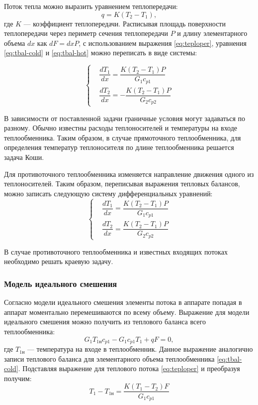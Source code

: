 Поток тепла можно выразить уравнением теплопередачи:
\begin{equation}\label{eq:teploper}
	q=K(T_2-T_1),
\end{equation}
где $K$ --- коэффициент теплопередачи. Расписывая площадь поверхности теплопередачи через периметр сечения теплопередачи $P$ и длину элементарного объема $d x$ как $d F = d x P$, с использованием выражения \eqref{eq:teploper}, уравнения \eqref{eq:tbal-cold} и \eqref{eq:tbal-hot} можно переписать в виде системы:

 \begin{equation} \label{eq:tep.pryamo}
 \left\{
 \begin{aligned}
 &\dfrac{dT_1}{dx}=\dfrac{K(T_2-T_1)P}{G_1 c_{p1}}        \\
 &\dfrac{dT_2}{dx}=-\dfrac{K(T_2-T_1)P}{G_2 c_{p2}}            
 \end{aligned}
 \right.
 \end{equation}

В зависимости от поставленной задачи граничные условия могут задаваться по разному. Обычно известны расходы теплоносителей и температуры на входе теплообменника. Таким образом, в случае прямоточного теплообменника, для определения температур теплоносителя по длине теплообменника решается задача Коши. 

Для противоточного теплообменника изменяется направление движения одного из теплоносителей. Таким образом, переписывая выражения тепловых балансов,  можно записать следующую систему дифференциальных уравнений:
 \begin{equation}\label{eq:tep.protivo}
 \left\{
 \begin{aligned}
 &\dfrac{dT_1}{dx}=\dfrac{K(T_2-T_1)P}{G_1 c_{p1}}        \\
 &\dfrac{dT_2}{dx}=\dfrac{K(T_2-T_1)P}{G_2 c_{p2}}            
 \end{aligned}
 \right. 
 \end{equation}
 
В случае противоточного теплообменника и известных входящих потоках необходимо решать краевую задачу.

\subsubsection*{Модель идеального смешения}
Согласно модели идеального смешения элементы потока в аппарате попадая в аппарат моментально перемешиваются по всему объему. Выражение для модели идеального смешения можно получить из теплового баланса всего теплообменника:
\begin{equation}
G_1 T_{1н} c_{p1}-G_1 c_{p1} T_1 + q F=0,
\end{equation}
где $T_{1н}$ --- температура на входе в теплообменник.
Данное выражение аналогично записи теплового баланса для элементарного объема теплообменника \eqref{eq:tbal-cold}. Подставляя выражение для теплового потока \eqref{eq:teploper} и преобразуя получим:
\begin{equation}
T_1-T_{1н} = \dfrac{K(T_1-T_2)F}{G_1 c_{p1}}
\end{equation}

